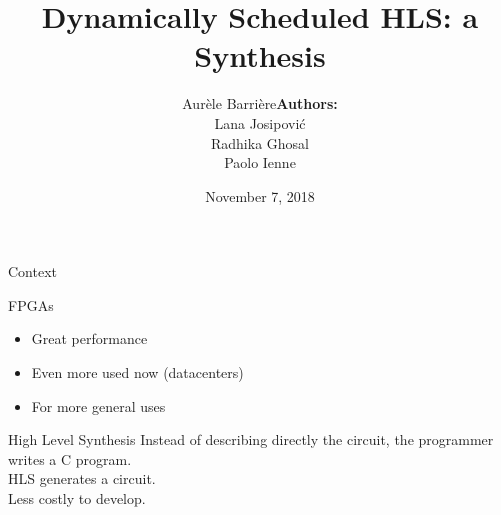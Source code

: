\documentclass[page number]{beamer}
\def\outline{
  \begin{frame}[plain,noframenumbering]
    \frametitle{Outline}
    \tableofcontents[currentsection]
  \end{frame}
}
\begin{document}
\title{Dynamically Scheduled HLS: a Synthesis}

\author[Aur\`ele Barri\`ere]{Aur\`ele Barri\`ere\hfill\textbf{Authors:}\begin{tabular}{c}
    Lana Josipovi\'c\\
    Radhika Ghosal\\
    Paolo Ienne\\
  \end{tabular}}

\date{November 7, 2018}

\def\outline{
  \begin{frame}[plain,noframenumbering]
    \frametitle{Outline}
    \tableofcontents[currentsection]
  \end{frame}
}

\begin{frame}
  \vspace{-2cm}
  \maketitle
  \vspace{-4cm}
\end{frame}



\begin{frame}{Context}
  \begin{block}{FPGAs}
    \begin{itemize}
      \item Great performance
      \item Even more used now (datacenters)
      \item For more general uses
    \end{itemize}
  \end{block}
  \vfill
  \begin{block}{High Level Synthesis}
    Instead of describing directly the circuit, the programmer writes a C program.\\
    HLS generates a circuit.\\
    Less costly to develop.
  \end{block}
\end{frame}
\end{document}
